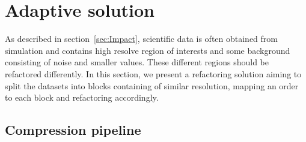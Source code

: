 \documentclass[conference]{IEEEtran}
\theoremstyle{remark}
\begin{document}
\section{Adaptive solution}

As described in section~\ref{sec:Impact}, scientific data is often obtained from simulation and contains high resolve region of interests and some background consisting of noise and smaller values. These different regions should be refactored differently.
In this section, we present a refactoring solution aiming to split the datasets into blocks containing of similar resolution, mapping an order to each block and refactoring accordingly.

\subsection{Compression pipeline}

\end{document}
